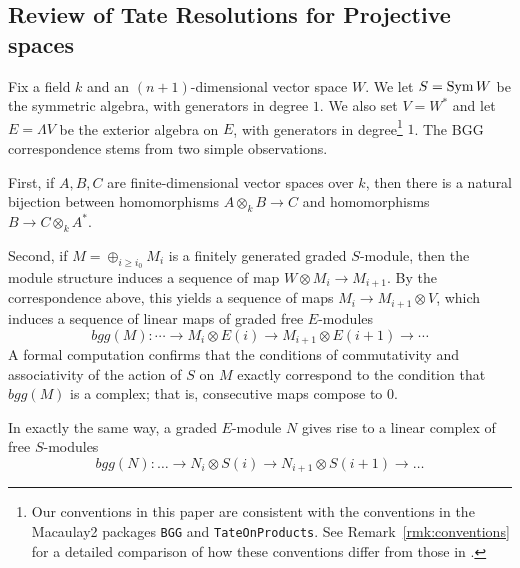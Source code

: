 \documentclass[twoside,12pt, leqno]{amsart}
\def\PP{{\mathbb P}}
\begin{document}

\subsection{Review of Tate Resolutions for Projective spaces}
Fix a field $k$ and an $(n+1)$-dimensional vector space $W$.  We let $S=\operatorname{Sym} W$ be the symmetric algebra, with generators in degree $1$.  We also set $V=W^*$ and let $E=\Lambda V$ be the exterior algebra on $E$, with generators in degree\footnote{Our conventions in this paper are consistent with the conventions in the Macaulay2 packages {\tt BGG} and {\tt TateOnProducts}.  See Remark~\ref{rmk:conventions} for a detailed comparison of how these conventions differ from those in \cite{EFS,EES}.}  $1$.   The BGG correspondence stems from two simple observations.


First, if $A, B, C$ are finite-dimensional vector spaces over $k$, then there is a natural bijection between  homomorphisms $A\otimes_kB\to C$ and homomorphisms
$ B \to C\otimes_k A^*$.

Second, if $M = \oplus_{i\geq i_0} M_i$ is a finitely generated graded $S$-module, then the module structure induces a sequence of map $W\otimes M_i \to M_{i+1}$.  By the correspondence above, this yields a sequence of maps $M_i\to M_{i+1}\otimes V$, which induces a sequence of
linear maps of graded free $E$-modules 
$$ 
bgg(M): \cdots \to M_i\otimes E(i) \to M_{i+1}\otimes E(i+1) \to \cdots
$$
A formal computation confirms that the conditions of commutativity and associativity of the action of $S$ on $M$ exactly correspond to the condition that $bgg(M)$ is a complex; that is, consecutive maps compose to 0.

In exactly the same way, a graded $E$-module $N$ gives rise to a linear  complex of free $S$-modules
$$bgg(N): \ldots \to N_i \otimes S(i) \to N_{i+1} \otimes  S(i+1) \to \ldots $$
\end{document}
